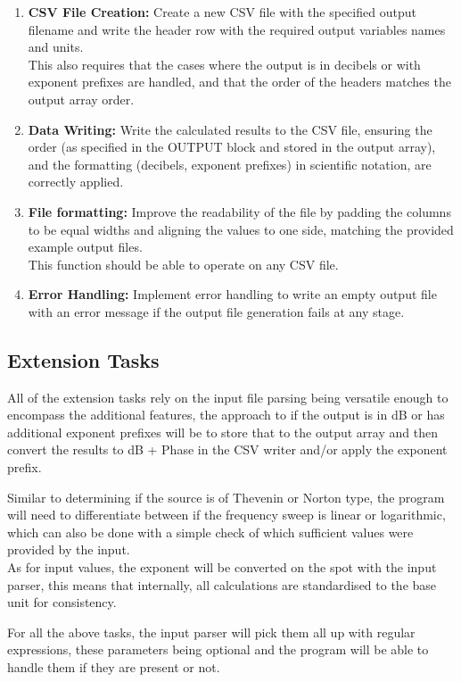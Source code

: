 \documentclass[conference]{IEEEtran}
\begin{document}
\begin{enumerate}
    \item \textbf{CSV File Creation:} Create a new CSV file with the specified output filename and write the header row with the required output variables names and units.\\
    This also requires that the cases where the output is in decibels or with exponent prefixes are handled, and that the order of the headers matches the output array order.
    \item \textbf{Data Writing:} Write the calculated results to the CSV file, ensuring the order (as specified in the OUTPUT block and stored in the output array), 
    and the formatting (decibels, exponent prefixes) in scientific notation, are correctly applied.
    \item \textbf{File formatting:} Improve the readability of the file by padding the columns to be equal widths and aligning the values to one side, matching the provided example output files.\\
    This function should be able to operate on any CSV file.
    \item \textbf{Error Handling:} Implement error handling to write an empty output file with an error message if the output file generation fails at any stage.
\end{enumerate}

\subsection*{Extension Tasks}
All of the extension tasks rely on the input file parsing being versatile enough to encompass the 
additional features, the approach to if the output is in dB or has additional exponent prefixes will be to store that to the output 
array and then convert the results to dB + Phase in the CSV writer and/or apply the exponent prefix.

 Similar to determining if the source is of Thevenin or Norton type, the program will need to differentiate between if the frequency sweep is linear or logarithmic,
 which can also be done with a simple check of which sufficient values were provided by the input.\\

As for input values, the exponent will be converted on the spot with the input parser, this means that internally, all calculations are standardised to the base unit for consistency.

For all the above tasks, the input parser will pick them all up with regular expressions, these parameters being optional and the program will be able to handle them if they are present or not.
\end{document}
